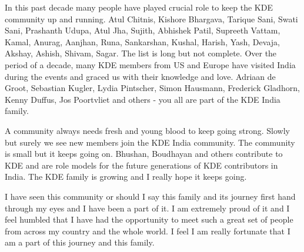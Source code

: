 In this past decade many people have played crucial role to keep the KDE community up and running. Atul Chitnis, Kishore Bhargava, Tarique Sani, Swati Sani, Prashanth Udupa, Atul Jha, Sujith, Abhishek Patil, Supreeth Vattam, Kamal, Anurag, Aanjhan, Runa, Sankarshan, Kushal, Harish, Yash, Devaja, Akshay, Ashish, Shivam, Sagar. The list is long but not complete. Over the period of a decade, many KDE members from US and Europe have visited India during the events and graced us with their knowledge and love. Adriaan de Groot, Sebastian Kugler, Lydia Pintscher, Simon Hausmann, Frederick Gladhorn, Kenny Duffus, Jos Poortvliet and others - you all are part of the KDE India family.


A community always needs fresh and young blood to keep going strong. Slowly but surely we see new members join the KDE India community. The community is small but it keeps going on. Bhushan, Boudhayan and others contribute to KDE and are role models for the future generations of KDE contributors in India. The KDE family is growing and I really hope it keeps going.

I have seen this community or should I say this family and its journey first hand through my eyes and I have been a part of it. I am extremely proud of it and I feel humbled that I have had the opportunity to meet such a great set of people from across my country and the whole world. I feel I am really fortunate that I am a part of this journey and this family.